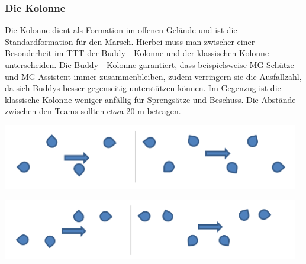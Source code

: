 \subsubsection{Die Kolonne}
Die Kolonne dient als Formation im offenen Gelände und ist die Standardformation für den Marsch. Hierbei muss man zwischer einer Besonderheit im \ac{TTT} der Buddy - Kolonne und der klassischen Kolonne unterscheiden. Die Buddy - Kolonne garantiert, dass beispielsweise MG-Schütze und MG-Assistent immer zusammenbleiben, zudem verringern sie die Ausfallzahl, da sich Buddys besser gegenseitig unterstützen können. Im Gegenzug ist die klassische Kolonne weniger anfällig für Sprengsätze und Beschuss. Die Abstände zwischen den Teams sollten etwa 20 m betragen.\\
\begin{minipage}[t]{1\textwidth}
	\includegraphics[width=13cm]{./img/grundlagen/formationen/Kolonne.png}
	\label{Kolonne}
\end{minipage}
\begin{minipage}[t]{1\textwidth}
	\includegraphics[width=13cm]{./img/grundlagen/formationen/Buddykolonne.png}
\end{minipage}

